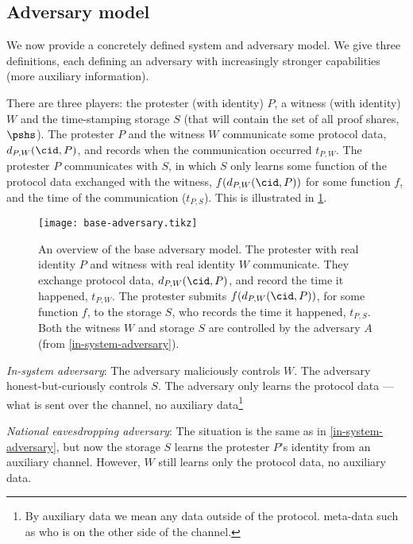 \subsection{Adversary model}%
\label{formal-adversary-model}

We now provide a concretely defined system and adversary model.
We give three definitions, each defining an adversary with increasingly stronger 
capabilities (\ie more auxiliary information).

There are three players: the protester (with identity) \(P\), a witness (with 
identity) \(W\) and the time-stamping storage \(S\) (that will contain the set 
of all proof shares, \(\pshs\)).
The protester \(P\) and the witness \(W\) communicate some protocol data,
\(d_{P,W}(\cid, P)\), and records when the communication occurred \(t_{P,W}\).
The protester \(P\) communicates with \(S\), in which \(S\) only learns some 
function of the protocol data exchanged with the witness, \(f(d_{P,W}(\cid, 
  P))\) for some function \(f\), and the time of the communication 
(\(t_{P,S}\)).
This is illustrated in \cref{fig:base-adversary}.

\begin{figure}
  \centering
  \texttt{[image: base-adversary.tikz]}
  \caption{\label{fig:base-adversary}%
    An overview of the base adversary model.
    The protester with real identity \(P\) and witness with real identity \(W\) 
    communicate.
    They exchange protocol data, \(d_{P,W}(\cid, P)\), and record the time it 
    happened, \(t_{P,W}\).
    The protester submits \(f(d_{P,W}(\cid, P))\), for some function \(f\), to 
    the storage \(S\), who records the time it happened, \(t_{P,S}\).
    Both the witness \(W\) and storage \(S\) are controlled by the adversary 
    \(A\) (from \cref{in-system-adversary}).
  }
\end{figure}

\begin{adversaries}
\item\label{in-system-adversary}
  \emph{In-system adversary}:
  The adversary maliciously controls \(W\).
  The adversary honest-but-curiously controls \(S\).
  The adversary only learns the protocol data --- \ie what is sent over the 
  channel, no auxiliary data\footnote{%
    By auxiliary data we mean any data outside of the protocol.
    \Eg meta-data such as who is on the other side of the channel.
  }

\item\label{deanonymizing-storage-adversary}
  \emph{National eavesdropping adversary}:
  The situation is the same as in \cref{in-system-adversary}, but now the storage 
  \(S\) learns the protester \(P\)'s identity from an auxiliary channel.
  However, \(W\) still learns only the protocol data, no auxiliary data.

\end{adversaries}

